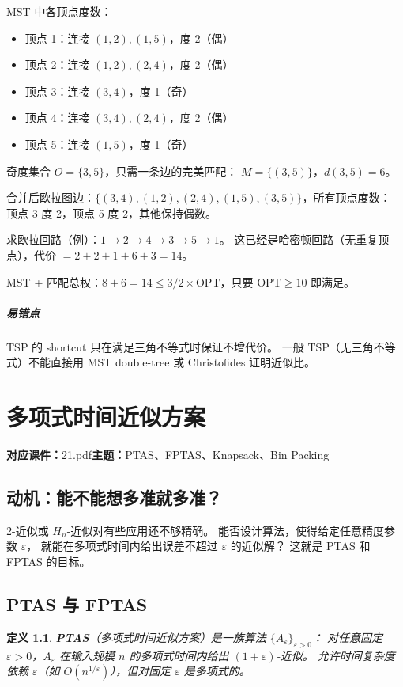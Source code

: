 \documentclass[UTF8,openany,12pt]{ctexbook}
\newtheorem{definition}{定义}[chapter]
\theoremstyle{remark}
\newcommand{\lecture}[3]{
  \chapter{#2}
  \noindent\textbf{对应课件：}#1\hfill\textbf{主题：}#3
  \vspace{0.6em}
}
\newcommand{\pitfall}[1]{\paragraph{易错点}#1}
\newcommand{\OPT}{\mathrm{OPT}}
\begin{document}
MST 中各顶点度数：
\begin{itemize}
  \item 顶点 1：连接 $(1,2),(1,5)$，度 2（偶）
  \item 顶点 2：连接 $(1,2),(2,4)$，度 2（偶）
  \item 顶点 3：连接 $(3,4)$，度 1（奇）
  \item 顶点 4：连接 $(3,4),(2,4)$，度 2（偶）
  \item 顶点 5：连接 $(1,5)$，度 1（奇）
\end{itemize}
奇度集合 $O = \{3, 5\}$，只需一条边的完美匹配：
$M = \{(3,5)\}$，$d(3,5)=6$。

合并后欧拉图边：$\{(3,4),(1,2),(2,4),(1,5),(3,5)\}$，所有顶点度数：
顶点 3 度 2，顶点 5 度 2，其他保持偶数。

求欧拉回路（例）：$1\to 2\to 4\to 3\to 5\to 1$。
这已经是哈密顿回路（无重复顶点），代价 $= 2+2+1+6+3 = 14$。

MST + 匹配总权：$8+6=14 \le 3/2 \times \OPT$，只要 $\OPT \ge 10$ 即满足。

\pitfall{
  TSP 的 shortcut 只在满足三角不等式时保证不增代价。
  一般 TSP（无三角不等式）不能直接用 MST double-tree 或 Christofides 证明近似比。
}

\lecture{21.pdf}{多项式时间近似方案}{PTAS、FPTAS、Knapsack、Bin Packing}

\section*{动机：能不能想多准就多准？}

2-近似或 $H_n$-近似对有些应用还不够精确。
能否设计算法，使得给定任意精度参数 $\varepsilon$，
就能在多项式时间内给出误差不超过 $\varepsilon$ 的近似解？
这就是 PTAS 和 FPTAS 的目标。

\section{PTAS 与 FPTAS}

\begin{definition}
\textbf{PTAS}（多项式时间近似方案）是一族算法 $\{A_\varepsilon\}_{\varepsilon>0}$：
对任意固定 $\varepsilon > 0$，$A_\varepsilon$ 在输入规模 $n$ 的多项式时间内给出 $(1+\varepsilon)$-近似。
允许时间复杂度依赖 $\varepsilon$（如 $O(n^{1/\varepsilon})$），但对固定 $\varepsilon$ 是多项式的。
\end{definition}
\end{document}
